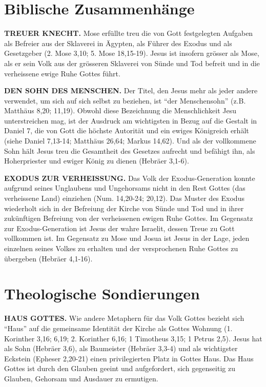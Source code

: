 \documentclass[]{krantz}
\begin{document}
\section{Biblische Zusammenhänge}\label{biblische-zusammenhuxe4nge-2}

\textbf{TREUER KNECHT.} Mose erfüllte treu die von Gott festgelegten
Aufgaben als Befreier aus der Sklaverei in Ägypten, als Führer des
Exodus und als Gesetzgeber (2. Mose 3,10; 5. Mose 18,15-19). Jesus ist
insofern grösser als Mose, als er sein Volk aus der grösseren Sklaverei
von Sünde und Tod befreit und in die verheissene ewige Ruhe Gottes
führt.

\textbf{DEN SOHN DES MENSCHEN.} Der Titel, den Jesus mehr als jeder
andere verwendet, um sich auf sich selbst zu beziehen, ist ``der
Menschensohn'' (z.B. Matthäus 8,20; 11,19). Obwohl diese Bezeichnung die
Menschlichkeit Jesu unterstreichen mag, ist der Ausdruck am wichtigsten
in Bezug auf die Gestalt in Daniel 7, die von Gott die höchste Autorität
und ein ewiges Königreich erhält (siehe Daniel 7,13-14; Matthäus 26,64;
Markus 14,62). Und als der vollkommene Sohn hält Jesus treu die
Gesamtheit des Gesetzes aufrecht und befähigt ihn, als Hoherpriester und
ewiger König zu dienen (Hebräer 3,1-6).

\textbf{EXODUS ZUR VERHEISSUNG.} Das Volk der Exodus-Generation konnte
aufgrund seines Unglaubens und Ungehorsams nicht in den Rest Gottes (das
verheissene Land) einziehen (Num. 14,20-24; 20,12). Das Muster des
Exodus wiederholt sich in der Befreiung der Kirche von Sünde und Tod und
in ihrer zukünftigen Befreiung von der verheissenen ewigen Ruhe Gottes.
Im Gegensatz zur Exodus-Generation ist Jesus der wahre Israelit, dessen
Treue zu Gott vollkommen ist. Im Gegensatz zu Mose und Josua ist Jesus
in der Lage, jeden einzelnen seines Volkes zu erhalten und der
versprochenen Ruhe Gottes zu übergeben (Hebräer 4,1-16).

\section{Theologische Sondierungen}\label{theologische-sondierungen}

\textbf{HAUS GOTTES.} Wie andere Metaphern für das Volk Gottes bezieht
sich ``Haus'' auf die gemeinsame Identität der Kirche als Gottes Wohnung
(1. Korinther 3,16; 6,19; 2. Korinther 6,16; 1 Timotheus 3,15; 1 Petrus
2,5). Jesus hat als Sohn (Hebräer 3,6), als Baumeister (Hebräer 3,3-4)
und als wichtigster Eckstein (Epheser 2,20-21) einen privilegierten
Platz in Gottes Haus. Das Haus Gottes ist durch den Glauben geeint und
aufgefordert, sich gegenseitig zu Glauben, Gehorsam und Ausdauer zu
ermutigen.
\end{document}
